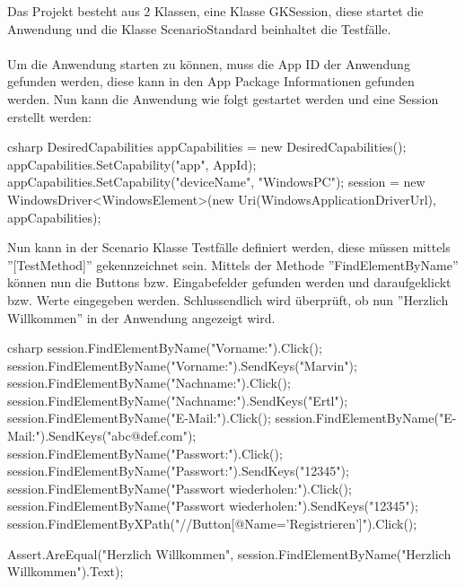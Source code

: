 Das Projekt besteht aus 2 Klassen, eine Klasse GKSession, diese startet die Anwendung und die Klasse ScenarioStandard beinhaltet die Testfälle.
\\\\
Um die Anwendung starten zu können, muss die App ID der Anwendung gefunden werden, diese kann in den App Package Informationen gefunden werden. \cite{appid} Nun kann die Anwendung wie folgt gestartet werden und eine Session erstellt werden:

\begin{code}{csharp}
                DesiredCapabilities appCapabilities = new DesiredCapabilities();
appCapabilities.SetCapability("app", AppId);
appCapabilities.SetCapability("deviceName", "WindowsPC");
session = new WindowsDriver<WindowsElement>(new Uri(WindowsApplicationDriverUrl), appCapabilities);
\end{code}

Nun kann in der Scenario Klasse Testfälle definiert werden, diese müssen mittels ''[TestMethod]'' gekennzeichnet sein. Mittels der Methode ''FindElementByName'' können nun die Buttons bzw. Eingabefelder gefunden werden und daraufgeklickt bzw. Werte eingegeben werden. Schlussendlich wird überprüft, ob nun ''Herzlich Willkommen'' in der Anwendung angezeigt wird.

\begin{code}{csharp}
	session.FindElementByName("Vorname:").Click();
	session.FindElementByName("Vorname:").SendKeys("Marvin");
	session.FindElementByName("Nachname:").Click();
	session.FindElementByName("Nachname:").SendKeys("Ertl");
	session.FindElementByName("E-Mail:").Click();
	session.FindElementByName("E-Mail:").SendKeys("abc@def.com");
	session.FindElementByName("Passwort:").Click();
	session.FindElementByName("Passwort:").SendKeys("12345");
	session.FindElementByName("Passwort wiederholen:").Click();
	session.FindElementByName("Passwort wiederholen:").SendKeys("12345");
	session.FindElementByXPath("//Button[@Name='Registrieren']").Click();
	
	Assert.AreEqual("Herzlich Willkommen", session.FindElementByName("Herzlich Willkommen").Text);
\end{code}



